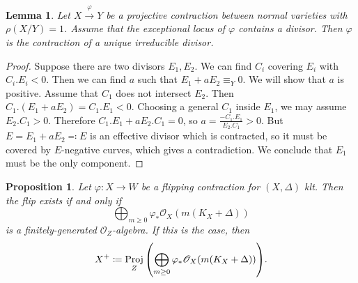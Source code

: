 \documentclass[leqno, openany]{memoir}
\newtheorem{prop}[thm]{Proposition}
\newtheorem{lem}[thm]{Lemma}
\theoremstyle{definition}
\theoremstyle{remark}
\theoremstyle{plain}
\theoremstyle{definition}
\theoremstyle{remark}
\newcommand{\msc}[1]{\mathscr{#1}}
\DeclareMathOperator{\Proj}{Proj}
\begin{document}
\begin{lem}
    Let $X \xrightarrow{\varphi} Y$ be a projective contraction between normal varieties with $\rho(X/Y) = 1$. Assume that the exceptional locus of $\varphi$ contains a divisor. Then $\varphi$ is the contraction of a unique irreducible divisor.
\end{lem}

\begin{proof}
    Suppose there are two divisors $E_1, E_2$. We can find $C_i$ covering $E_i$ with $C_i.E_i < 0$. Then we can find $a$ such that $E_1 + a E_2 \equiv_Y 0$. We will show that $a$ is positive. Assume that $C_1$ does not intersect $E_2$. Then $C_1.(E_1 + aE_2) = C_1.E_1 < 0$. Choosing a general $C_1$ inside $E_1$, we may assume $E_2.C_1 > 0$. Therefore $C_1.E_1 + aE_2.C_1 = 0$, so $a = \frac{-C_1.E_1}{E_2.C_1} > 0$. But $E = E_1 + aE_2 \eqqcolon E$ is an effective divisor which is contracted, so it must be covered by $E$-negative curves, which gives a contradiction. We conclude that $E_1$ must be the only component.
\end{proof}

\begin{prop}
    Let $\varphi \colon X \to W$ be a flipping contraction for $(X, \Delta)$ klt. Then the flip exists if and only if
    \[ \bigoplus_{m \geq 0} \varphi_* \msc{O}_X(m(K_X + \Delta)) \]
    is a finitely-generated $\msc{O}_Z$-algebra. If this is the case, then
    \[ X^+ \coloneqq \Proj_Z \qty(\bigoplus_{m \geq 0} \varphi_* \msc{O}_X(m(K_X + \Delta))). \]
\end{prop}
\end{document}
